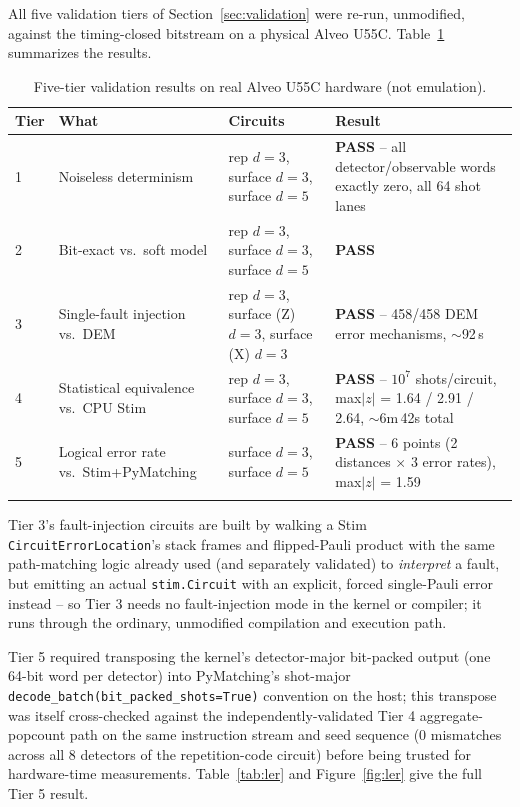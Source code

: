 \documentclass[pdflatex,sn-basic]{sn-jnl}
\begin{document}
All five validation tiers of Section~\ref{sec:validation} were re-run, unmodified, against the timing-closed bitstream on a physical Alveo U55C. Table~\ref{tab:hwvalidation} summarizes the results.

\begin{table}[h]
\caption{Five-tier validation results on real Alveo U55C hardware (not emulation).}\label{tab:hwvalidation}
\begin{tabular}{@{}p{0.6cm}p{4.4cm}p{3.6cm}p{4.1cm}@{}}
\toprule
Tier & What & Circuits & Result \\
\midrule
1 & Noiseless determinism & rep $d{=}3$, surface $d{=}3$, surface $d{=}5$ & \textbf{PASS} -- all detector/observable words exactly zero, all 64 shot lanes \\
2 & Bit-exact vs.\ soft model & rep $d{=}3$, surface $d{=}3$, surface $d{=}5$ & \textbf{PASS} \\
3 & Single-fault injection vs.\ DEM & rep $d{=}3$, surface (Z) $d{=}3$, surface (X) $d{=}3$ & \textbf{PASS} -- 458/458 DEM error mechanisms, $\sim$92\,s \\
4 & Statistical equivalence vs.\ CPU Stim & rep $d{=}3$, surface $d{=}3$, surface $d{=}5$ & \textbf{PASS} -- $10^7$ shots/circuit, max$|z|$ = 1.64 / 2.91 / 2.64, $\sim$6m\,42s total \\
5 & Logical error rate vs.\ Stim+PyMatching & surface $d{=}3$, surface $d{=}5$ & \textbf{PASS} -- 6 points (2 distances $\times$ 3 error rates), max$|z|$ = 1.59 \\
\botrule
\end{tabular}
\end{table}

Tier 3's fault-injection circuits are built by walking a Stim \texttt{CircuitErrorLocation}'s stack frames and flipped-Pauli product with the same path-matching logic already used (and separately validated) to \emph{interpret} a fault, but emitting an actual \texttt{stim.Circuit} with an explicit, forced single-Pauli error instead -- so Tier 3 needs no fault-injection mode in the kernel or compiler; it runs through the ordinary, unmodified compilation and execution path.

Tier 5 required transposing the kernel's detector-major bit-packed output (one 64-bit word per detector) into PyMatching's shot-major \texttt{decode\_batch(bit\_packed\_shots=True)} convention on the host; this transpose was itself cross-checked against the independently-validated Tier 4 aggregate-popcount path on the same instruction stream and seed sequence (0 mismatches across all 8 detectors of the repetition-code circuit) before being trusted for hardware-time measurements. Table~\ref{tab:ler} and Figure~\ref{fig:ler} give the full Tier 5 result.
\end{document}
